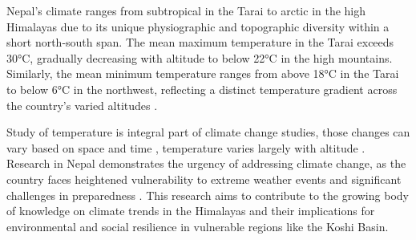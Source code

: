Nepal's climate ranges from subtropical in the Tarai to arctic in the high Himalayas due to its unique physiographic and topographic diversity within a short north-south span. The mean maximum temperature in the Tarai exceeds 30°C, gradually decreasing with altitude to below 22°C in the high mountains. Similarly, the mean minimum temperature ranges from above 18°C in the Tarai to below 6°C in the northwest, reflecting a distinct temperature gradient across the country's varied altitudes \parencite{marahatta_temporal_2009}.


Study of temperature is integral part of climate change studies, those changes can vary based on space and time \parencite{bajracharya_future_2023}, temperature varies largely with altitude \parencite{chand_trend_2019}. Research in Nepal demonstrates the urgency of addressing climate change, as the country faces heightened vulnerability to extreme weather events and significant challenges in preparedness \parencite{chapagain_unpacking_2021}. This research aims to contribute to the growing body of knowledge on climate trends in the Himalayas and their implications for environmental and social resilience in vulnerable regions like the Koshi Basin.

